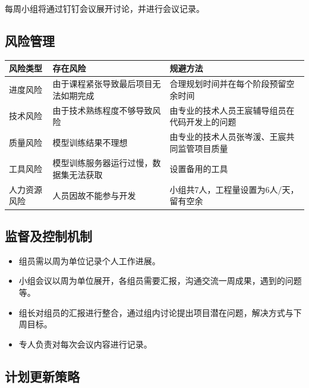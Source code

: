 \documentclass[
  hyperref, a4paper]{ctexart}
\providecommand{\tightlist}{%
  \setlength{\itemsep}{0pt}\setlength{\parskip}{0pt}}
\begin{document}
每周小组将通过钉钉会议展开讨论，并进行会议记录。

\hypertarget{ux98ceux9669ux7ba1ux7406}{%
\subsection{风险管理}\label{ux98ceux9669ux7ba1ux7406}}

\begin{table}[H]
\small 
\begin{center}  
\begin{tabular}{|p{1.5cm}|p{3cm}|p{5cm}|}  
\hline  
风险类型 & 存在风险 & 规避方法  \\ \hline  
进度风险 & 由于课程紧张导致最后项目无法如期完成 & 合理规划时间并在每个阶段预留空余时间 \\ \hline  
技术风险 & 由于技术熟练程度不够导致风险 & 由专业的技术人员王宸辅导组员在代码开发上的问题 \\  \hline  
质量风险 & 模型训练结果不理想 & 由专业的技术人员张岑湲、王宸共同监管项目质量 \\  \hline  
工具风险 & 模型训练服务器运行过慢，数据集无法获取 & 设置备用的工具 \\  \hline  
人力资源风险 & 人员因故不能参与开发 & 小组共7人，工程量设置为6人/天，留有空余 \\  \hline  
\end{tabular}  
\end{center}  
\end{table}

\hypertarget{ux76d1ux7763ux53caux63a7ux5236ux673aux5236}{%
\subsection{监督及控制机制}\label{ux76d1ux7763ux53caux63a7ux5236ux673aux5236}}

\begin{itemize}
\tightlist
\item
  组员需以周为单位记录个人工作进展。
\item
  小组会议以周为单位展开，各组员需要汇报，沟通交流一周成果，遇到的问题等。
\item
  组长对组员的汇报进行整合，通过组内讨论提出项目潜在问题，解决方式与下周目标。
\item
  专人负责对每次会议内容进行记录。
\end{itemize}

\hypertarget{ux8ba1ux5212ux66f4ux65b0ux7b56ux7565}{%
\subsection{计划更新策略}\label{ux8ba1ux5212ux66f4ux65b0ux7b56ux7565}}
\end{document}
